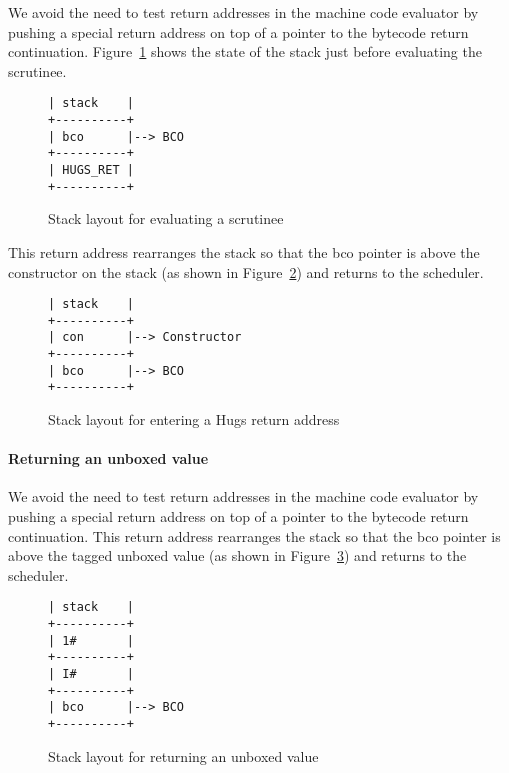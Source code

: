 \documentclass[11pt]{article}
\newcommand{\figref}[1]{Figure~\ref{fig:#1}}
\begin{document}
We avoid the need to test return addresses in the machine code
evaluator by pushing a special return address on top of a pointer to
the bytecode return continuation.  \figref{hugs-return-stack1}
shows the state of the stack just before evaluating the scrutinee.

\begin{figure}[ht]
\begin{center}
\begin{verbatim}
| stack    |
+----------+
| bco      |--> BCO
+----------+
| HUGS_RET |
+----------+
\end{verbatim}
%
\end{center}
\caption{Stack layout for evaluating a scrutinee}
\label{fig:hugs-return-stack1}
\end{figure}

This return address rearranges the stack so that the bco pointer is
above the constructor on the stack (as shown in
\figref{hugs-boxed-return}) and returns to the scheduler.

\begin{figure}[ht]
\begin{center}
\begin{verbatim}
| stack    |
+----------+
| con      |--> Constructor
+----------+
| bco      |--> BCO
+----------+
\end{verbatim}
%
\end{center}
\caption{Stack layout for entering a Hugs return address}
\label{fig:hugs-boxed-return}
\end{figure}

\paragraph{Returning an unboxed value}

We avoid the need to test return addresses in the machine code
evaluator by pushing a special return address on top of a pointer to
the bytecode return continuation.  This return address rearranges the
stack so that the bco pointer is above the tagged unboxed value (as
shown in \figref{hugs-entering-unboxed-return}) and returns to the
scheduler.

\begin{figure}[ht]
\begin{center}
\begin{verbatim}
| stack    |
+----------+
| 1#       |
+----------+
| I#       |
+----------+
| bco      |--> BCO
+----------+
\end{verbatim}
%
\end{center}
\caption{Stack layout for returning an unboxed value}
\label{fig:hugs-entering-unboxed-return}
\end{figure}
\end{document}
